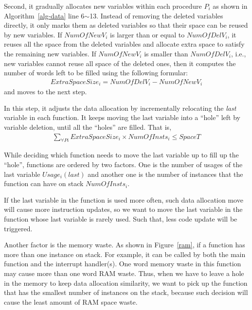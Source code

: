 Second, it gradually allocates new variables within each procedure
$P_i$ as shown in Algorithm~\ref{alg-data} line 6$\sim$13. 
Instead of removing the deleted variables directly, it only marks them as deleted variables so that their space can be 
reused by new variables. If $NumOfNewV_i$ is larger than or equal to $NumOfDelV_i$, it reuses all the space from the 
deleted variables and allocate extra space to satisfy the remaining new variables. 
If $NumOfNewV_i$ is smaller than $NumOfDelV_i$, i.e., new variables
cannot reuse all space of the deleted ones, then it computes the number of words left to be filled
using the following formular:
\begin{eqnarray}
ExtraSpaceSize_i = NumOfDelV_i - NumOfNewV_i
\end{eqnarray}
and moves to the next step.

In this step, it adjusts the data allocation by incrementally relocating the
{\em last} variable in each function. It keeps moving the last variable into a
``hole'' left by variable deletion, until all the ``holes'' are filled.
That is,
\begin{eqnarray}
\sum_{\forall Pi} ExtraSpaceSize_i \times NumOfInsts_i \leq SpaceT
\label{spacet}
\end{eqnarray}

While deciding which function needs to move the last variable up to fill up the ``hole'', 
functions are ordered by two factors.
One is the number of usages of the last variable $Usage_i(last)$ and another one is the number of instances 
that the function can have on stack $NumOfInsts_i$.

If the last variable in the function is used more often,
such data allocation move will cause more instruction updates, so we want
to move the last variable in the function whose last variable is
rarely used. Such that, less code update will be triggered.

Another factor is the memory waste. As shown in Figure~\ref{ram}, if a function
has more than one instance on stack. For example, it can be called by both the 
main function and the interrupt handler(s).
One word memory waste in this function may cause 
more than one word RAM waste. Thus, when we have to leave a 
hole in the memory to keep data allocation similarity, we want to
pick up the function that has the smallest number of instances
on the stack, because such decision will cause the least amount of
RAM space waste.

